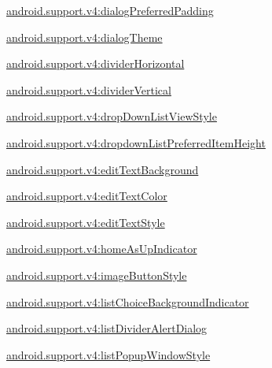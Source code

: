 {\ttfamily \hyperlink{classandroid_1_1support_1_1v4_1_1R_1_1styleable_a43f2be5deff68402fef3dcc0311e5255}{android.\+support.\+v4\+:dialog\+Preferred\+Padding}}

{\ttfamily \hyperlink{classandroid_1_1support_1_1v4_1_1R_1_1styleable_a3574ec976e7476da7ab6c1ba08c24d15}{android.\+support.\+v4\+:dialog\+Theme}}

{\ttfamily \hyperlink{classandroid_1_1support_1_1v4_1_1R_1_1styleable_a4f40263c3e11d2deb92c237d96ea15f0}{android.\+support.\+v4\+:divider\+Horizontal}}

{\ttfamily \hyperlink{classandroid_1_1support_1_1v4_1_1R_1_1styleable_a480131370c6899cceeda9f48459b5bdc}{android.\+support.\+v4\+:divider\+Vertical}}

{\ttfamily \hyperlink{classandroid_1_1support_1_1v4_1_1R_1_1styleable_a0da4ef3e81a5ae109c029dd45167387f}{android.\+support.\+v4\+:drop\+Down\+List\+View\+Style}}

{\ttfamily \hyperlink{classandroid_1_1support_1_1v4_1_1R_1_1styleable_aff7f53164ea3cbce6587faad4b37b944}{android.\+support.\+v4\+:dropdown\+List\+Preferred\+Item\+Height}}

{\ttfamily \hyperlink{classandroid_1_1support_1_1v4_1_1R_1_1styleable_a18052ba0b1c9793bc937f0c80db13b4f}{android.\+support.\+v4\+:edit\+Text\+Background}}

{\ttfamily \hyperlink{classandroid_1_1support_1_1v4_1_1R_1_1styleable_a61b858b456732138a1c8d3fe6521a2a2}{android.\+support.\+v4\+:edit\+Text\+Color}}

{\ttfamily \hyperlink{classandroid_1_1support_1_1v4_1_1R_1_1styleable_acaa134c2cef3cbfff2f66851831e5bd1}{android.\+support.\+v4\+:edit\+Text\+Style}}

{\ttfamily \hyperlink{classandroid_1_1support_1_1v4_1_1R_1_1styleable_a99213e6dd1efe95a588f624e59528c4d}{android.\+support.\+v4\+:home\+As\+Up\+Indicator}}

{\ttfamily \hyperlink{classandroid_1_1support_1_1v4_1_1R_1_1styleable_a549f21c88298e5099c63f6caa601fafb}{android.\+support.\+v4\+:image\+Button\+Style}}

{\ttfamily \hyperlink{classandroid_1_1support_1_1v4_1_1R_1_1styleable_a08f9b1ee1dd8bb92832fce16a96ae03f}{android.\+support.\+v4\+:list\+Choice\+Background\+Indicator}}

{\ttfamily \hyperlink{classandroid_1_1support_1_1v4_1_1R_1_1styleable_aeb30dd09362a7481a0324462b2ac5c82}{android.\+support.\+v4\+:list\+Divider\+Alert\+Dialog}}

{\ttfamily \hyperlink{classandroid_1_1support_1_1v4_1_1R_1_1styleable_ae7d26e004b40152e1dfd2b283043a64f}{android.\+support.\+v4\+:list\+Popup\+Window\+Style}}

